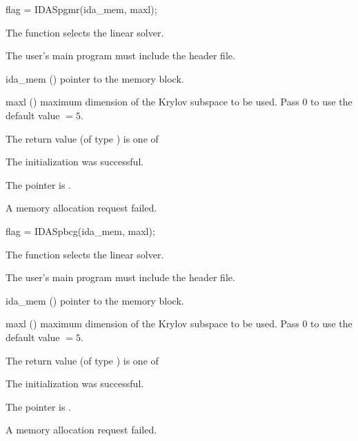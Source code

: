 {
  flag = IDASpgmr(ida\_mem, maxl);
}
{
  The function  selects the {\idaspgmr} linear solver. 

  The user's main program must include the  header file.
}
{
  \begin{args}
  \item[ida\_mem] ()
    pointer to the {\ida} memory block.
  \item[maxl] ()
    maximum dimension of the Krylov subspace to be used. Pass $0$ to use the 
    default value $=5$.
  \end{args}
}
{
  The return value  (of type ) is one of
  \begin{args}
  \item[\Id{IDASPILS\_SUCCESS}] 
    The {\idaspgmr} initialization was successful.
  \item[\Id{IDASPILS\_MEM\_NULL}]
    The  pointer is .
  \item[\Id{IDASPILS\_MEM\_FAIL}]
    A memory allocation request failed.
  \end{args}
}
{}
{
  flag = IDASpbcg(ida\_mem, maxl);
}
{
  The function  selects the {\idaspbcg} linear solver. 

  The user's main program must include the  header file.
}
{
  \begin{args}
  \item[ida\_mem] ()
    pointer to the {\ida} memory block.
  \item[maxl] ()
    maximum dimension of the Krylov subspace to be used. Pass $0$ to use the 
    default value $=5$.
  \end{args}
}
{
  The return value  (of type ) is one of
  \begin{args}
  \item[\Id{IDASPILS\_SUCCESS}] 
    The {\idaspbcg} initialization was successful.
  \item[\Id{IDASPILS\_MEM\_NULL}]
    The  pointer is .
  \item[\Id{IDASPILS\_MEM\_FAIL}]
    A memory allocation request failed.
  \end{args}
}
